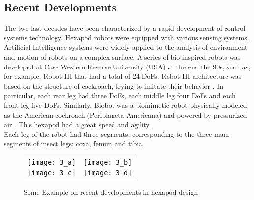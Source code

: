\subsection{Recent Developments}
The two last decades have been characterized by a rapid development of control systems technology. Hexapod robots were equipped with various sensing systems. Artificial Intelligence systems were widely applied to the analysis of environment and motion of robots on a complex surface. A series of bio inspired robots was developed at Case Western Reserve University (USA) at the end the 90s, such as, for example, Robot III that had a total of 24 DoFs. Robot III architecture was based on the structure of cockroach, trying to imitate their behavior \cite{25h}. In particular, each rear leg had three DoFs, each middle leg four DoFs and each front leg five DoFs. Similarly, Biobot was a biomimetic robot physically modeled as the American cockroach (Periplaneta Americana) and powered by pressurized air \cite{26h}. This hexapod had a great speed and agility. \\
Each leg of the robot had three segments, corresponding to the three main segments of insect legs: coxa, femur, and tibia.
\begin{figure}[h]
    \centering
    \begin{tabular}{ l l }
        \texttt{[image: 3\_a]} & 
        \texttt{[image: 3\_b]} \\ 
        \texttt{[image: 3\_c]} & 
        \texttt{[image: 3\_d]} \\ 
    \end{tabular}
    \caption{Some Example on recent developments in hexapod design}
    \label{fig3}
\end{figure}